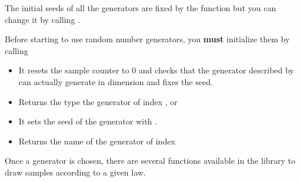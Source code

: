 The initial seeds of all the generators are fixed by the function
 but you can change it by calling .

Before starting to use random number generators, you {\bf must} initialize them by
calling
\begin{itemize}
\item {}
  \sshortdescribe It resets the sample counter to $0$ and checks that the
  generator described by  can actually generate
   in dimension  and fixes the seed.
\end{itemize}

\begin{itemize}

\item {}
  \sshortdescribe Returns the type the generator of index ,
   or 
\item {}
  \sshortdescribe It sets the seed of the generator  with
  .
\item {}
  \sshortdescribe Returns the name of the generator of index 
\end{itemize}

Once a generator is chosen, there are several functions available in the
library to draw samples according to a given law.


